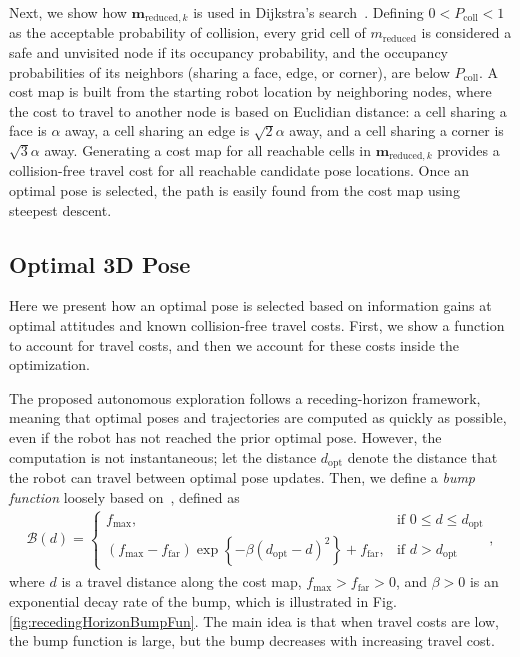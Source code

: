 \documentclass[conf]{new-aiaa}
\newcommand{\braces}[1]{\ensuremath{\left\{ #1 \right\}}}
\begin{document}
Next, we show how $\mathbf{m}_{\text{reduced},k}$ is used in Dijkstra's search~\cite{Dij59}. Defining $0<P_\text{coll}<1$ as the acceptable probability of collision, every grid cell of $ m_\text{reduced}$ is considered a safe and unvisited node if its occupancy probability, and the occupancy probabilities of its neighbors (sharing a face, edge, or corner), are below $P_\text{coll}$. A cost map is built from the starting robot location by neighboring nodes, where the cost to travel to another node is based on Euclidian distance: a cell sharing a face is $\alpha$ away, a cell sharing an edge is $\sqrt2\alpha$ away, and a cell sharing a corner is $\sqrt3\alpha$ away. Generating a cost map for all reachable cells in $\mathbf{m}_{\text{reduced},k}$ provides a collision-free travel cost for all reachable candidate pose locations. Once an optimal pose is selected, the path is easily found from the cost map using steepest descent.


\subsection{Optimal 3D Pose}

Here we present how an optimal pose is selected based on information gains at optimal attitudes and known collision-free travel costs. First, we show a function to account for travel costs, and then we account for these costs inside the optimization.

The proposed autonomous exploration follows a receding-horizon framework, meaning that optimal poses and trajectories are computed as quickly as possible, even if the robot has not reached the prior optimal pose. However, the computation is not instantaneous; let the distance $d_\text{opt}$ denote the distance that the robot can travel between optimal pose updates. Then, we define a \emph{bump function} loosely based on~\cite{Joh06}, defined as
\begin{align}
\label{eqn:BumpFunRecedingHorizon}
\mathcal B(d)=
\begin{cases}
f_\text{max},												& \text{if }0\leq d\leq d_\text{opt}
\\
(f_\text{max}-f_\text{far})\exp\braces{-\beta(d_\text{opt}-d)^2}+f_\text{far},	& \text{if }d>d_\text{opt}
\end{cases},
\end{align}
where $d$ is a travel distance along the cost map, $f_\text{max}>f_\text{far}>0$, and $\beta>0$ is an exponential decay rate of the bump, which is illustrated in Fig. \ref{fig:recedingHorizonBumpFun}. The main idea is that when travel costs are low, the bump function is large, but the bump decreases with increasing travel cost.
\end{document}
